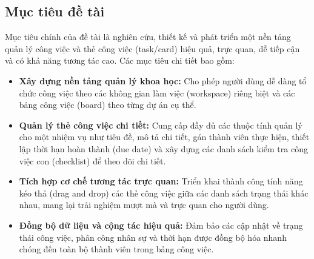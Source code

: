 \subsection{Mục tiêu đề tài}
Mục tiêu chính của đề tài là nghiên cứu, thiết kế và phát triển một nền tảng quản lý công việc và thẻ công việc (task/card) hiệu quả, trực quan, dễ tiếp cận và có khả năng tương tác cao. Các mục tiêu chi tiết bao gồm:
\begin{itemize}
    \item \textbf{Xây dựng nền tảng quản lý khoa học:} Cho phép người dùng dễ dàng tổ chức công việc theo các không gian làm việc (workspace) riêng biệt và các bảng công việc (board) theo từng dự án cụ thể.
    \item \textbf{Quản lý thẻ công việc chi tiết:} Cung cấp đầy đủ các thuộc tính quản lý cho một nhiệm vụ như tiêu đề, mô tả chi tiết, gán thành viên thực hiện, thiết lập thời hạn hoàn thành (due date) và xây dựng các danh sách kiểm tra công việc con (checklist) để theo dõi chi tiết.
    \item \textbf{Tích hợp cơ chế tương tác trực quan:} Triển khai thành công tính năng kéo thả (drag and drop) các thẻ công việc giữa các danh sách trạng thái khác nhau, mang lại trải nghiệm mượt mà và trực quan cho người dùng.
    \item \textbf{Đồng bộ dữ liệu và cộng tác hiệu quả:} Đảm bảo các cập nhật về trạng thái công việc, phân công nhân sự và thời hạn được đồng bộ hóa nhanh chóng đến toàn bộ thành viên trong bảng công việc.
\end{itemize}

